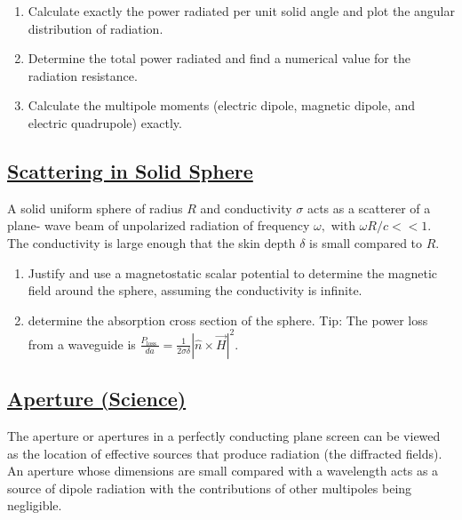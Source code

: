 \begin{enumerate}
	\item Calculate exactly the power radiated per unit solid angle and plot the angular distribution of radiation.
	\item  Determine the total power radiated and find a numerical value for the radiation resistance.
	\item Calculate the multipole moments (electric dipole, magnetic dipole, and electric quadrupole) exactly.	
\end{enumerate}

\subsection{\hyperref[Scattering in Solid Sphere]{Scattering in Solid Sphere}}

A solid uniform sphere of radius $R$ and conductivity $\sigma$ acts as a scatterer of a plane- wave beam of unpolarized radiation of frequency $\omega,$ with $\omega R / c<<1$. The conductivity is large enough that the skin depth $\delta$ is small compared to $R$.

\begin{enumerate}
	\item Justify and use a magnetostatic scalar potential to determine the magnetic field around the sphere, assuming the conductivity is infinite.
	\item determine the absorption cross section of the sphere. Tip: The power loss from a waveguide is $\frac{P_{\text {loss }}}{d a}=\frac{1}{2 \sigma \delta}|\hat{n} \times \vec{H}|^{2}$.
\end{enumerate}

\subsection{\hyperref[Aperture (Science)]{Aperture (Science)}}

The aperture or apertures in a perfectly conducting plane screen can be viewed as the location of effective sources that produce radiation (the diffracted fields). An aperture whose dimensions are small compared with a wavelength acts as a source of dipole radiation with the contributions of other multipoles being negligible.

